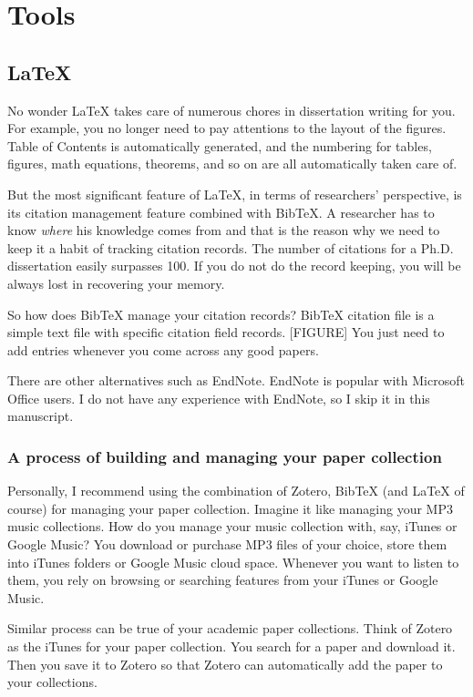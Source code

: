 \documentclass[11pt]{article}
\begin{document}
\section{Tools}

\subsection{LaTeX}

No wonder LaTeX takes care of numerous chores in dissertation writing
for you. For example, you no longer need to pay attentions to the layout of
the figures.  Table of Contents is automatically generated, and the
numbering for tables, figures, math equations, theorems, and so on are
all automatically taken care of. 

But the most significant feature of LaTeX, in terms of researchers'
perspective, is its citation management feature combined with BibTeX. A
researcher has to know \emph{where} his knowledge comes from and that is
the reason why we need to keep it a habit of tracking citation records.
The number of citations for a Ph.D. dissertation easily surpasses 100.
If you do not do the record keeping, you will be always lost in
recovering your memory.

So how does BibTeX manage your citation records? BibTeX citation file is a
simple text file with specific citation field records. [FIGURE] You just need
to add entries whenever you come across any good papers. 

There are other alternatives such as EndNote. EndNote is popular with
Microsoft Office users. I do not have any experience with EndNote, so I skip
it in this manuscript. 

\subsubsection{A process of building and managing your paper collection}
Personally, I recommend using the combination of Zotero, BibTeX (and
LaTeX of course) for managing your paper collection. Imagine it like
managing your MP3 music collections. How do you manage your music
collection with, say, iTunes or Google Music? You download or purchase
MP3 files of your choice, store them into iTunes folders or Google Music
cloud space. Whenever you want to listen to them, you rely on browsing or
searching features from your iTunes or Google Music.

Similar process can be true of your academic paper collections. Think of
Zotero as the iTunes for your paper collection. You search for a paper and
download it. Then you save it to Zotero so that Zotero can automatically add
the paper to your collections. 
\end{document}
